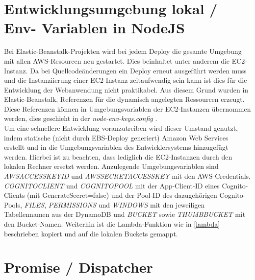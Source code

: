 \documentclass[a4paper, 12pt]{scrreprt}
\renewcommand\_{\textunderscore\allowbreak}
\begin{document}
\section{Entwicklungsumgebung lokal / Env- Variablen in NodeJS}

Bei Elastic-Beanstalk-Projekten wird bei jedem Deploy die gesamte Umgebung mit allen AWS-Resourcen neu gestartet. Dies beinhaltet unter anderem die EC2-Instanz. Da bei Quellcodeänderungen ein Deploy erneut ausgeführt werden muss und die Instanziierung einer EC2-Instanz zeitaufwendig sein kann ist dies für die Entwicklung der Webanwendung nicht praktikabel. Aus diesem Grund wurden in Elastic-Beanstalk, Referenzen \cite{AWSDc} für die dynamisch angelegten Ressourcen erzeugt. Diese Referenzen können in Umgebungsvariablen der EC2-Instanzen übernommen werden, dies geschieht in der \textit{node-env-keys.config} \cite{AWSDd}.\\[0.5cm]
Um eine schnellere Entwicklung voranzutreiben wird dieser Umstand genutzt, indem statische (nicht durch EBS-Deploy generiert) Amazon Web Services erstellt und in die Umgebungsvariablen des Entwicklersystems hinzugefügt werden.
Hierbei ist zu beachten, dass lediglich die EC2-Instanzen durch den lokalen Rechner ersetzt werden. Anzulegende Umgebungsvariablen sind
\textit{AWS\_ACCESS\_KEY\_ID} und \textit{AWS\_SECRET\_ACCESS\_KEY} mit den AWS-Credentials, \textit{COGNITO\_CLIENT} und \textit{COGNITO\_POOL} mit der App-Client-ID eines Cognito-Clients (mit GenerateSecret=false) und der Pool-ID des dazugehörigen Cognito-Pools, \textit{FILES}, \textit{PERMISSIONS} und \textit{WINDOWS} mit den jeweiligen Tabellennamen aus der DynamoDB und \textit{BUCKET} sowie \textit{THUMB\_BUCKET} mit den Bucket-Namen. Weiterhin ist die Lambda-Funktion wie in \ref{lambda} beschrieben kopiert und auf die lokalen Buckets gemappt.  





\section{Promise / Dispatcher}
\label{dispatcher}
\end{document}
